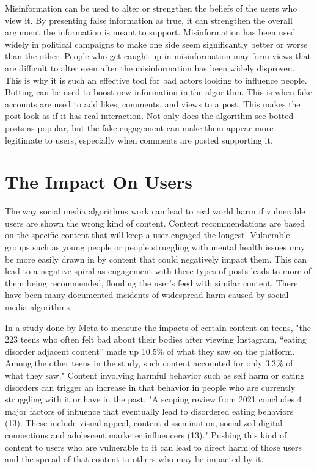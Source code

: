 \documentclass[conference]{IEEEtran}
\begin{document}
Misinformation can be used to alter or strengthen the beliefs of the users who view it. By presenting false information as true, it can strengthen the overall argument the information is meant to support. Misinformation has been used widely in political campaigns to make one side seem significantly better or worse than the other. People who get caught up in misinformation may form views that are difficult to alter even after the misinformation has been widely disproven. This is why it is such an effective tool for bad actors looking to influence people. Botting can be used to boost new information in the algorithm. This is when fake accounts are used to add likes, comments, and views to a post. This makes the post look as if it has real interaction. Not only does the algorithm see botted posts as popular, but the fake engagement can make them appear more legitimate to users, especially when comments are posted supporting it.

\section{The Impact On Users}
The way social media algorithms work can lead to real world harm if vulnerable users are shown the wrong kind of content. Content recommendations are based on the specific content that will keep a user engaged the longest. Vulnerable groups such as young people or people struggling with mental health issues may be more easily drawn in by content that could negatively impact them. This can lead to a negative spiral as engagement with these types of posts leads to more of them being recommended, flooding the user's feed with similar content. There have been many documented incidents of widespread harm caused by social media algorithms.

In a study done by Meta to measure the impacts of certain content on teens, "the 223 teens who often felt bad about their bodies after viewing Instagram, “eating disorder adjacent content” made up 10.5\% of what they saw on the platform. Among the other teens in the study, such content accounted for only 3.3\% of what they saw."\cite{Reuters2025_InstagramEDContent} Content involving harmful behavior such as self harm or eating disorders can trigger an increase in that behavior in people who are currently struggling with it or have in the past. "A scoping review from 2021 concludes 4 major factors of influence that eventually lead to disordered eating behaviors (13). These include visual appeal, content dissemination, socialized digital connections and adolescent marketer influencers (13)."\cite{Nawaz2024_SocialMediaED} Pushing this kind of content to users who are vulnerable to it can lead to direct harm of those users and the spread of that content to others who may be impacted by it.
\end{document}
